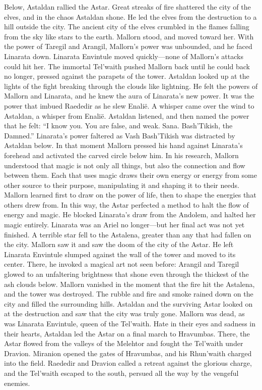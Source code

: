 \documentclass[smalldemyvopaper,11pt,twoside,onecolumn,openright,extrafontsizes]{memoir}
\begin{document}
{{Below, Astaldan rallied the Astar. Great streaks of fire shattered the city of the elves, and in the chaos Astaldan shone. He led the elves from the destruction to a hill outside the city. The ancient city of the elves crumbled in the flames falling from the sky like stars to the earth.
Mallorn stood, and moved toward her. With the power of Taregil and Arangil, Mallorn’s power was unbounded, and he faced Linarata down. Linarata Envintule moved quickly—none of Mallorn’s attacks could hit her. The immortal Tel’waith pushed Mallorn back until he could back no longer, pressed against the parapets of the tower. Astaldan looked up at the lights of the fight breaking through the clouds like lightning. He felt the powers of Mallorn and Linarata, and he knew the aura of Linarata’s new power. It was the power that imbued Raededir as he slew Enalië. A whisper came over the wind to Astaldan, a whisper from Enalië. Astaldan listened, and then named the power that he felt:
“I know you. You are false, and weak. Sana. Bash’Tikish, the Damned.”
Linarata’s power faltered as Vash Bash’Tikish was distracted by Astaldan below. In that moment Mallorn pressed his hand against Linarata’s forehead and activated the carved circle below him. In his research, Mallorn understood that magic is not only all things, but also the connection and flow between them. Each that uses magic draws their own energy or energy from some other source to their purpose, manipulating it and shaping it to their needs. Mallorn learned first to draw on the power of life, then to shape the energies that others drew from. In this way, the Astar perfected a method to halt the flow of energy and magic. He blocked Linarata’s draw from the Andolem, and halted her magic entirely. Linarata was an Ariel no longer—but her final act was not yet finished. A terrible star fell to the Astalena, greater than any that had fallen on the city. Mallorn saw it and saw the doom of the city of the Astar. He left Linarata Envintule slumped against the wall of the tower and moved to its center. There, he invoked a magical art not seen before: Arangil and Taregil glowed to an unfaltering brightness that shone even through the thickest of the ash clouds below. Mallorn vanished in the moment that the fire hit the Astalena, and the tower was destroyed. The rubble and fire and smoke rained down on the city and filled the surrounding hills. Astaldan and the surviving Astar looked on at the destruction and saw that the city was truly gone. Mallorn was dead, as was Linarata Envintule, queen of the Tel’waith.
Hate in their eyes and sadness in their hearts, Astaldan led the Astar on a final march to Hravumbas. There, the Astar flowed from the valleys of the Melehtor and fought the Tel’waith under Dravion. Miranion opened the gates of Hravumbas, and his Rhun’waith charged into the field. Raededir and Dravion called a retreat against the glorious charge, and the Tel’waith escaped to the south, persued all the way by the vengeful enemies.
}}
\end{document}

